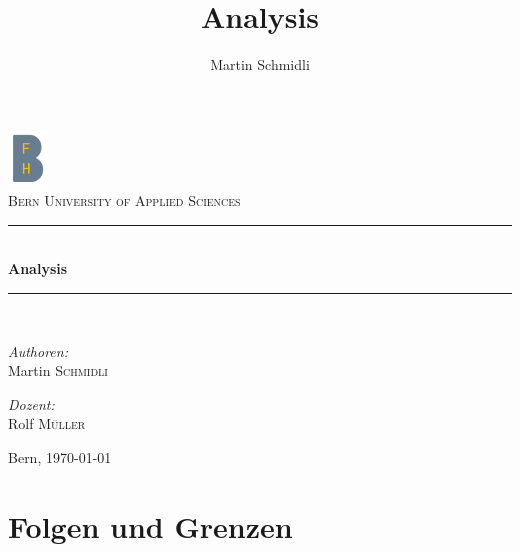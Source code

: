 \documentclass[a4paper,10pt]{report}
\title{Analysis}
\author{Martin Schmidli}
\begin{document}
\pagestyle{empty} %
\begin{titlepage}
\begin{center}

\includegraphics[width=0.08\textwidth]{images/bfh_logo.png}\\[1cm]    
\textsc{\LARGE Bern University of Applied Sciences}\\[1.5cm]

\newcommand{\HRule}{\rule{\linewidth}{0.3mm}}
\HRule \\[1cm]
{\huge \bfseries Analysis }\\[0.7cm]
\HRule \\[1.5cm]

\begin{minipage}{0.4\textwidth}
\begin{flushleft} \large
\emph{Authoren:}\\
Martin \textsc{Schmidli}\\
\end{flushleft}
\end{minipage}
\hfill
\begin{minipage}{0.4\textwidth}
\begin{flushright} \large
\emph{Dozent:} \\
Rolf \textsc{Müller}
\end{flushright}
\end{minipage}
\vfill

Bern, {\large \today}
\end{center}
\end{titlepage}
\pagestyle {plain}

\tableofcontents
\newpage

\chapter{Folgen und Grenzen}
\end{document}
